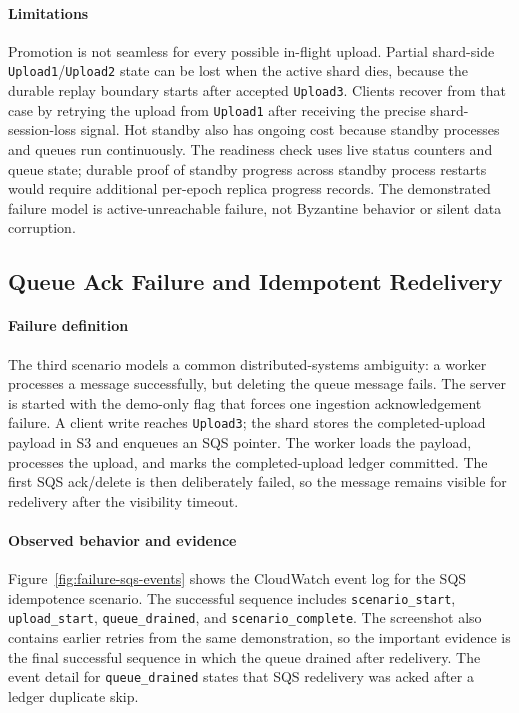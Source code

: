 \documentclass[conference]{IEEEtran}
\begin{document}
\paragraph{Limitations}
Promotion is not seamless for every possible in-flight upload. Partial shard-side \texttt{Upload1}/\texttt{Upload2} state can be lost when the active shard dies, because the durable replay boundary starts after accepted \texttt{Upload3}. Clients recover from that case by retrying the upload from \texttt{Upload1} after receiving the precise shard-session-loss signal. Hot standby also has ongoing cost because standby processes and queues run continuously. The readiness check uses live status counters and queue state; durable proof of standby progress across standby process restarts would require additional per-epoch replica progress records. The demonstrated failure model is active-unreachable failure, not Byzantine behavior or silent data corruption.

\subsection{Queue Ack Failure and Idempotent Redelivery}

\paragraph{Failure definition}
The third scenario models a common distributed-systems ambiguity: a worker processes a message successfully, but deleting the queue message fails. The server is started with the demo-only flag that forces one ingestion acknowledgement failure. A client write reaches \texttt{Upload3}; the shard stores the completed-upload payload in S3 and enqueues an SQS pointer. The worker loads the payload, processes the upload, and marks the completed-upload ledger committed. The first SQS ack/delete is then deliberately failed, so the message remains visible for redelivery after the visibility timeout.

\paragraph{Observed behavior and evidence}
Figure~\ref{fig:failure-sqs-events} shows the CloudWatch event log for the SQS idempotence scenario. The successful sequence includes \texttt{scenario\_start}, \texttt{upload\_start}, \texttt{queue\_drained}, and \texttt{scenario\_complete}. The screenshot also contains earlier retries from the same demonstration, so the important evidence is the final successful sequence in which the queue drained after redelivery. The event detail for \texttt{queue\_drained} states that SQS redelivery was acked after a ledger duplicate skip.
\end{document}
